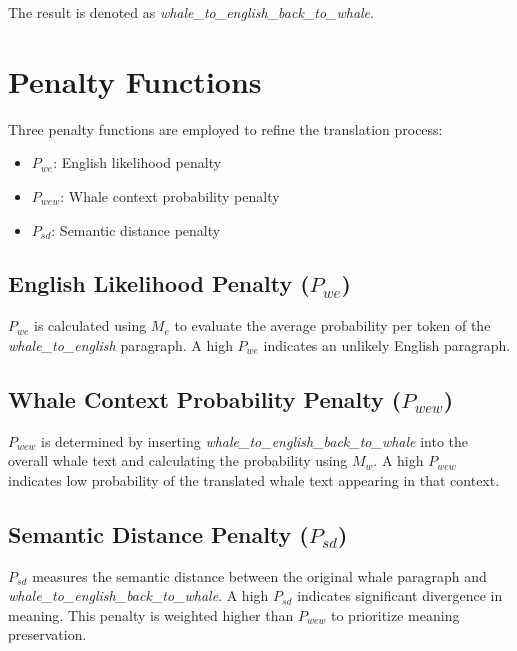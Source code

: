 \documentclass{article}
\begin{document}
The result is denoted as \textit{whale\_to\_english\_back\_to\_whale}.

\section{Penalty Functions}
Three penalty functions are employed to refine the translation process:

\begin{itemize}
    \item $P_{we}$: English likelihood penalty
    \item $P_{wew}$: Whale context probability penalty
    \item $P_{sd}$: Semantic distance penalty
\end{itemize}
\subsection{English Likelihood Penalty (\texorpdfstring{\(P_{we}\)}{Pwe})}
$P_{we}$ is calculated using $M_e$ to evaluate the average probability per token of the \textit{whale\_to\_english} paragraph. A high $P_{we}$ indicates an unlikely English paragraph.

\subsection{Whale Context Probability Penalty (\texorpdfstring{\(P_{wew}\)}{Pwew})}

$P_{wew}$ is determined by inserting \textit{whale\_to\_english\_back\_to\_whale} into the overall whale text and calculating the probability using $M_w$. A high $P_{wew}$ indicates low probability of the translated whale text appearing in that context.

\subsection{Semantic Distance Penalty (\texorpdfstring{\(P_{sd}\)}{Psd})}
$P_{sd}$ measures the semantic distance between the original whale paragraph and \textit{whale\_to\_english\_back\_to\_whale}. A high $P_{sd}$ indicates significant divergence in meaning. This penalty is weighted higher than $P_{wew}$ to prioritize meaning preservation.
\end{document}
